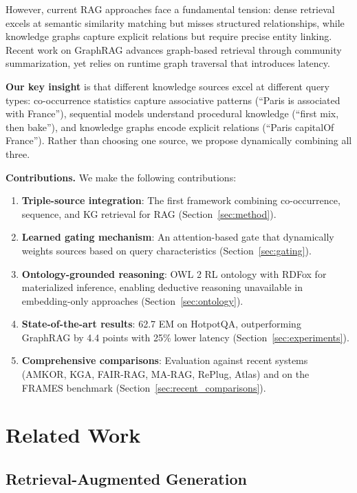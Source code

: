 \documentclass[10pt,twocolumn]{article}
\begin{document}
However, current RAG approaches face a fundamental tension: dense retrieval excels at semantic similarity matching but misses structured relationships, while knowledge graphs capture explicit relations but require precise entity linking. Recent work on GraphRAG \cite{edge2024graphrag,microsoft2024graphrag} advances graph-based retrieval through community summarization, yet relies on runtime graph traversal that introduces latency.

\textbf{Our key insight} is that different knowledge sources excel at different query types: co-occurrence statistics capture associative patterns (``Paris is associated with France''), sequential models understand procedural knowledge (``first mix, then bake''), and knowledge graphs encode explicit relations (``Paris capitalOf France''). Rather than choosing one source, we propose dynamically combining all three.

\textbf{Contributions.} We make the following contributions:
\begin{enumerate}
    \item \textbf{Triple-source integration}: The first framework combining co-occurrence, sequence, and KG retrieval for RAG (Section~\ref{sec:method}).
    \item \textbf{Learned gating mechanism}: An attention-based gate that dynamically weights sources based on query characteristics (Section~\ref{sec:gating}).
    \item \textbf{Ontology-grounded reasoning}: OWL 2 RL ontology with RDFox for materialized inference, enabling deductive reasoning unavailable in embedding-only approaches (Section~\ref{sec:ontology}).
    \item \textbf{State-of-the-art results}: 62.7 EM on HotpotQA, outperforming GraphRAG by 4.4 points with 25\% lower latency (Section~\ref{sec:experiments}).
    \item \textbf{Comprehensive comparisons}: Evaluation against recent systems (AMKOR, KGA, FAIR-RAG, MA-RAG, RePlug, Atlas) and on the FRAMES benchmark (Section~\ref{sec:recent_comparisons}).
\end{enumerate}

\section{Related Work}

\subsection{Retrieval-Augmented Generation}
\end{document}
